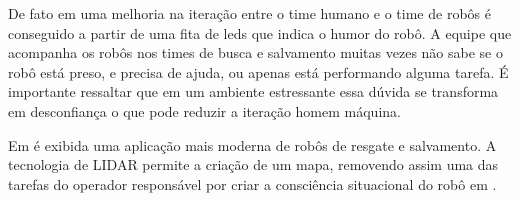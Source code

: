 \documentclass[
	article,			%
	11pt,				%
	oneside,			%
	a4paper,			%
	english,			%
	brazil,				%
	sumario=tradicional	
	]{abntex2}
\begin{document}


De fato em \cite{akgun2022using} uma melhoria na iteração entre o time humano e o time de robôs é conseguido a partir de uma fita de leds que indica o humor do robô. A equipe que acompanha os robôs nos times de busca e salvamento muitas vezes não sabe se o robô está preso, e precisa de ajuda, ou apenas está performando alguma tarefa. É importante ressaltar que em um ambiente estressante essa dúvida se transforma em desconfiança o que pode reduzir a iteração homem máquina.


Em \cite{tardioli2016} é exibida uma aplicação mais moderna de robôs de resgate e salvamento. A tecnologia de LIDAR permite a criação de um mapa, removendo assim uma das tarefas do operador responsável por criar a consciência situacional do robô em \cite{Robin2004}. 

\end{document}
